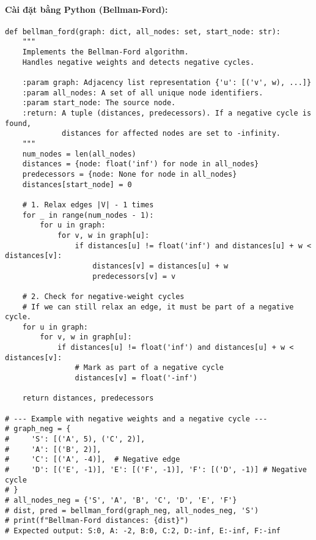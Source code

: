 \documentclass[a4paper,12pt]{article}
\begin{document}
\paragraph{Cài đặt bằng Python (Bellman-Ford):}
\begin{lstlisting}[style=pythonstyle, caption={Cài đặt Bellman-Ford trong Python, có phát hiện chu trình âm.}, label={lst:python_bellmanford}]
def bellman_ford(graph: dict, all_nodes: set, start_node: str):
    """
    Implements the Bellman-Ford algorithm.
    Handles negative weights and detects negative cycles.

    :param graph: Adjacency list representation {'u': [('v', w), ...]}
    :param all_nodes: A set of all unique node identifiers.
    :param start_node: The source node.
    :return: A tuple (distances, predecessors). If a negative cycle is found,
             distances for affected nodes are set to -infinity.
    """
    num_nodes = len(all_nodes)
    distances = {node: float('inf') for node in all_nodes}
    predecessors = {node: None for node in all_nodes}
    distances[start_node] = 0

    # 1. Relax edges |V| - 1 times
    for _ in range(num_nodes - 1):
        for u in graph:
            for v, w in graph[u]:
                if distances[u] != float('inf') and distances[u] + w < distances[v]:
                    distances[v] = distances[u] + w
                    predecessors[v] = v

    # 2. Check for negative-weight cycles
    # If we can still relax an edge, it must be part of a negative cycle.
    for u in graph:
        for v, w in graph[u]:
            if distances[u] != float('inf') and distances[u] + w < distances[v]:
                # Mark as part of a negative cycle
                distances[v] = float('-inf')

    return distances, predecessors

# --- Example with negative weights and a negative cycle ---
# graph_neg = {
#     'S': [('A', 5), ('C', 2)],
#     'A': [('B', 2)],
#     'C': [('A', -4)],  # Negative edge
#     'D': [('E', -1)], 'E': [('F', -1)], 'F': [('D', -1)] # Negative cycle
# }
# all_nodes_neg = {'S', 'A', 'B', 'C', 'D', 'E', 'F'}
# dist, pred = bellman_ford(graph_neg, all_nodes_neg, 'S')
# print(f"Bellman-Ford distances: {dist}") 
# Expected output: S:0, A: -2, B:0, C:2, D:-inf, E:-inf, F:-inf
\end{lstlisting}
\end{document}
